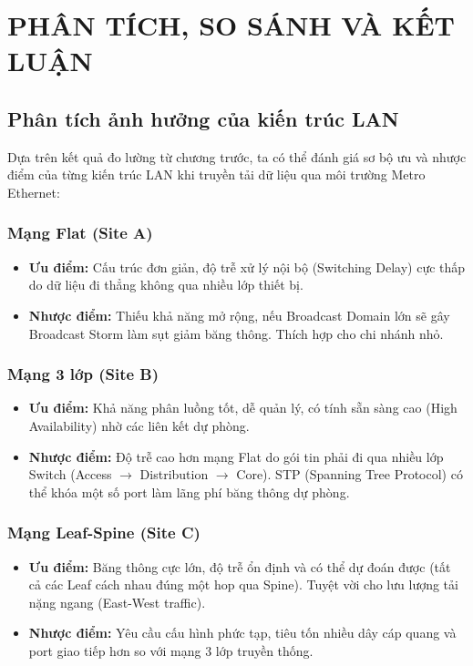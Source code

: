 \section{PHÂN TÍCH, SO SÁNH VÀ KẾT LUẬN}

\subsection{Phân tích ảnh hưởng của kiến trúc LAN}
Dựa trên kết quả đo lường từ chương trước, ta có thể đánh giá sơ bộ ưu và nhược điểm của từng kiến trúc LAN khi truyền tải dữ liệu qua môi trường Metro Ethernet:

\subsubsection{Mạng Flat (Site A)}
\begin{itemize}
    \item \textbf{Ưu điểm:} Cấu trúc đơn giản, độ trễ xử lý nội bộ (Switching Delay) cực thấp do dữ liệu đi thẳng không qua nhiều lớp thiết bị.
    \item \textbf{Nhược điểm:} Thiếu khả năng mở rộng, nếu Broadcast Domain lớn sẽ gây Broadcast Storm làm sụt giảm băng thông. Thích hợp cho chi nhánh nhỏ.
\end{itemize}

\subsubsection{Mạng 3 lớp (Site B)}
\begin{itemize}
    \item \textbf{Ưu điểm:} Khả năng phân luồng tốt, dễ quản lý, có tính sẵn sàng cao (High Availability) nhờ các liên kết dự phòng.
    \item \textbf{Nhược điểm:} Độ trễ cao hơn mạng Flat do gói tin phải đi qua nhiều lớp Switch (Access $\rightarrow$ Distribution $\rightarrow$ Core). STP (Spanning Tree Protocol) có thể khóa một số port làm lãng phí băng thông dự phòng.
\end{itemize}

\subsubsection{Mạng Leaf-Spine (Site C)}
\begin{itemize}
    \item \textbf{Ưu điểm:} Băng thông cực lớn, độ trễ ổn định và có thể dự đoán được (tất cả các Leaf cách nhau đúng một hop qua Spine). Tuyệt vời cho lưu lượng tải nặng ngang (East-West traffic).
    \item \textbf{Nhược điểm:} Yêu cầu cấu hình phức tạp, tiêu tốn nhiều dây cáp quang và port giao tiếp hơn so với mạng 3 lớp truyền thống.
\end{itemize}

